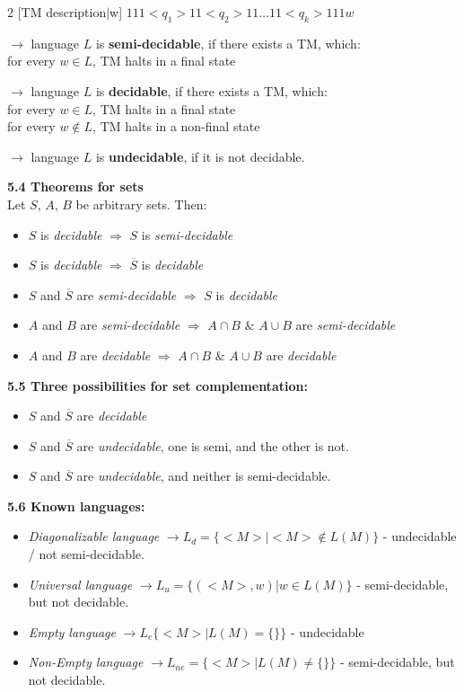 \documentclass{article}
\begin{document}
\begin{multicols}{2}
[TM description$|$w]
$111<q_1>11<q_2>11\dots11<q_k>111w$ \smallskip

$\rightarrow$ language $L$ is \textbf{semi-decidable}, if there exists a TM, which:\\
    for every $w \in L$, TM halts in a final state

$\rightarrow$ language $L$ is \textbf{decidable}, if there exists a TM, which:\\
    for every $w \in L$, TM halts in a final state\\
    for every $w \notin L$, TM halts in a non-final state


$\rightarrow$ language $L$ is \textbf{undecidable}, if it is not decidable.

\textbf{5.4 Theorems for sets}\\
Let $S$, $A$, $B$ be arbitrary sets. Then:
\begin{itemize}
    \setlength\itemsep{-0.4em}
    \item $S$ is \textit{decidable} $\Rightarrow$ $S$ is \textit{semi-decidable}
    \item $S$ is \textit{decidable} $\Rightarrow$ $\overline{S}$ is \textit{decidable}
    \item $S$ and $\overline{S}$ are \textit{semi-decidable} $\Rightarrow$ $S$ is \textit{decidable}
    \item $A$ and $B$ are \textit{semi-decidable} $\Rightarrow$ $A \cap B $ $\&$ $A \cup B$ are \textit{semi-decidable}
    \item $A$ and $B$ are \textit{decidable} $\Rightarrow$ $A \cap B $ $\&$ $A \cup B$ are \textit{decidable}
\end{itemize}

\textbf{5.5 Three possibilities for set complementation:}
\begin{itemize}
    \setlength\itemsep{-0.2em}
    \item $S$ and $\overline{S}$ are \textit{decidable}
    \item $S$ and $\overline{S}$ are \textit{undecidable}, one is semi, and the other is not.
    \item $S$ and $\overline{S}$ are \textit{undecidable}, and neither is semi-decidable.
\end{itemize}

\textbf{5.6 Known languages:}\\
\begin{itemize}
    \setlength\itemsep{-0.2em}
    \item \textit{Diagonalizable language} $\rightarrow L_d = \{<M >| <M> \notin L(M)\}$ - undecidable / not semi-decidable.
    \item \textit{Universal language} $\rightarrow L_u = \{(<M>, w) | w \in L(M)\}$ - semi-decidable, but not decidable.
    \item \textit{Empty language} $\rightarrow L_e \{<M> | L(M) = \{\}\}$ - undecidable
    \item \textit{Non-Empty language} $\rightarrow L_{ne} = \{<M> | L(M) \neq \{\}\}$ - semi-decidable, but not decidable.
\end{itemize}


\end{multicols}
\end{document}
